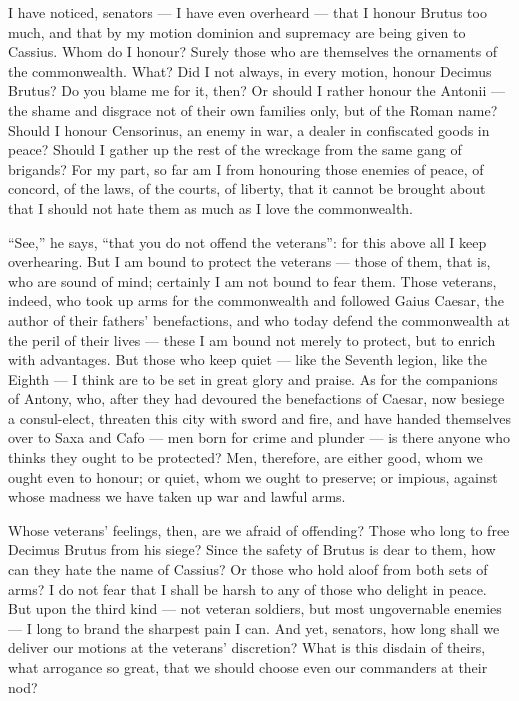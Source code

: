  I have noticed, senators --- I have even overheard --- that I honour Brutus too much, and that by my motion dominion and supremacy are being given to Cassius. Whom do I honour? Surely those who are themselves the ornaments of the commonwealth. What? Did I not always, in every motion, honour Decimus Brutus? Do you blame me for it, then? Or should I rather honour the Antonii --- the shame and disgrace not of their own families only, but of the Roman name? Should I honour Censorinus, an enemy in war, a dealer in confiscated goods in peace? Should I gather up the rest of the wreckage from the same gang of brigands? For my part, so far am I from honouring those enemies of peace, of concord, of the laws, of the courts, of liberty, that it cannot be brought about that I should not hate them as much as I love the commonwealth.

 ``See,'' he says, ``that you do not offend the veterans'': for this above all I keep overhearing. But I am bound to protect the veterans --- those of them, that is, who are sound of mind; certainly I am not bound to fear them. Those veterans, indeed, who took up arms for the commonwealth and followed Gaius Caesar, the author of their fathers' benefactions, and who today defend the commonwealth at the peril of their lives --- these I am bound not merely to protect, but to enrich with advantages. But those who keep quiet --- like the Seventh legion, like the Eighth --- I think are to be set in great glory and praise. As for the companions of Antony, who, after they had devoured the benefactions of Caesar, now besiege a consul-elect, threaten this city with sword and fire, and have handed themselves over to Saxa and Cafo --- men born for crime and plunder --- is there anyone who thinks they ought to be protected? Men, therefore, are either good, whom we ought even to honour; or quiet, whom we ought to preserve; or impious, against whose madness we have taken up war and lawful arms.

 Whose veterans' feelings, then, are we afraid of offending? Those who long to free Decimus Brutus from his siege? Since the safety of Brutus is dear to them, how can they hate the name of Cassius? Or those who hold aloof from both sets of arms? I do not fear that I shall be harsh to any of those who delight in peace. But upon the third kind --- not veteran soldiers, but most ungovernable enemies --- I long to brand the sharpest pain I can. And yet, senators, how long shall we deliver our motions at the veterans' discretion? What is this disdain of theirs, what arrogance so great, that we should choose even our commanders at their nod?

